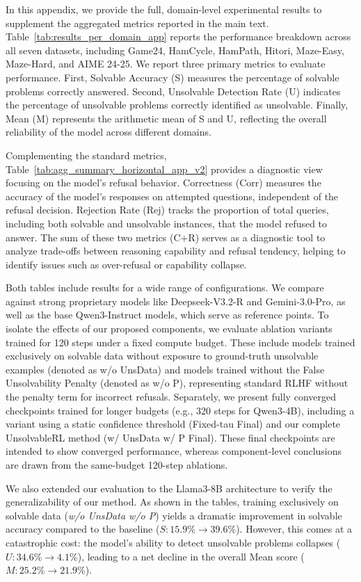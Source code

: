 In this appendix, we provide the full, domain-level experimental results to supplement the aggregated metrics reported in the main text. Table~\ref{tab:results_per_domain_app} reports the performance breakdown across all seven datasets, including Game24, HamCycle, HamPath, Hitori, Maze-Easy, Maze-Hard, and AIME 24-25. We report three primary metrics to evaluate performance. First, Solvable Accuracy (S) measures the percentage of solvable problems correctly answered. Second, Unsolvable Detection Rate (U) indicates the percentage of unsolvable problems correctly identified as unsolvable. Finally, Mean (M) represents the arithmetic mean of S and U, reflecting the overall reliability of the model across different domains.

Complementing the standard metrics, Table~\ref{tab:agg_summary_horizontal_app_v2} provides a diagnostic view focusing on the model's refusal behavior. Correctness (Corr) measures the accuracy of the model's responses on attempted questions, independent of the refusal decision. Rejection Rate (Rej) tracks the proportion of total queries, including both solvable and unsolvable instances, that the model refused to answer. The sum of these two metrics (C+R) serves as a diagnostic tool to analyze trade-offs between reasoning capability and refusal tendency, helping to identify issues such as over-refusal or capability collapse.

Both tables include results for a wide range of configurations. We compare against strong proprietary models like Deepseek-V3.2-R and Gemini-3.0-Pro, as well as the base Qwen3-Instruct models, which serve as reference points. To isolate the effects of our proposed components, we evaluate ablation variants trained for 120 steps under a fixed compute budget. These include models trained exclusively on solvable data without exposure to ground-truth unsolvable examples (denoted as w/o UnsData) and models trained without the False Unsolvability Penalty (denoted as w/o P), representing standard RLHF without the penalty term for incorrect refusals. Separately, we present fully converged checkpoints trained for longer budgets (e.g., 320 steps for Qwen3-4B), including a variant using a static confidence threshold (Fixed-tau Final) and our complete UnsolvableRL method (w/ UnsData w/ P Final). These final checkpoints are intended to show converged performance, whereas component-level conclusions are drawn from the same-budget 120-step ablations.

We also extended our evaluation to the Llama3-8B architecture to verify the generalizability of our method. As shown in the tables, training exclusively on solvable data (\textit{w/o UnsData w/o P}) yields a dramatic improvement in solvable accuracy compared to the baseline ($S: 15.9\% \to 39.6\%$). However, this comes at a catastrophic cost: the model's ability to detect unsolvable problems collapses ($U: 34.6\% \to 4.1\%$), leading to a net decline in the overall Mean score ($M: 25.2\% \to 21.9\%$). 

